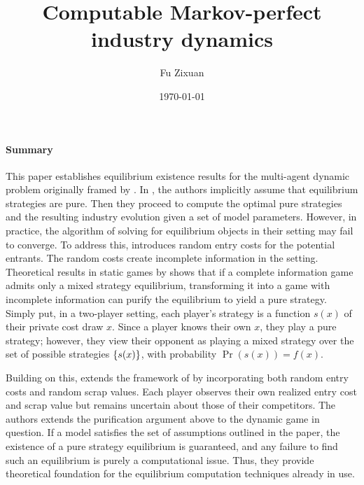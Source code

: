 \documentclass[12pt]{article}[margin=1in]
\title{\textbf{Computable Markov-perfect industry dynamics}}
\author{Fu Zixuan}
\date{\today}
\begin{document}
\maketitle






\paragraph{Summary} This paper \citep{doraszelski2010computable} establishes equilibrium existence results for the multi-agent dynamic problem originally framed by \citet{ericson1995markov}. In \citet{pakes1994computing}, the authors implicitly assume that equilibrium strategies are pure. Then they proceed to compute the optimal pure strategies and the resulting industry evolution given a set of model parameters. However, in practice, the algorithm of solving for equilibrium objects in their setting may fail to converge. To address this, \citet{pakes1994computing} introduces random entry costs for the potential entrants. The random costs create incomplete information in the setting.  Theoretical results in static games by \cite{harsanyi1973games} shows that if a complete information game admits only a mixed strategy equilibrium, transforming it into a game with incomplete information can purify the equilibrium to yield a pure strategy.  Simply put, in a two-player setting, each player's strategy is a function $s(x)$ of their private cost draw $x$. Since a player knows their own $x$, they play a pure strategy; however, they view their opponent as playing a mixed strategy over the set of possible strategies $\left\{s(x)\right\}$, with probability $\Pr(s(x))=f(x)$. 

Building on this, \citet{doraszelski2010computable} extends the framework of \citet{pakes1994computing} by incorporating both random entry costs and random scrap values. Each player observes their own realized entry cost and scrap value but remains uncertain about those of their competitors. The authors extends the purification argument above to the dynamic game in question. If a model satisfies the set of assumptions outlined in the paper, the existence of a pure strategy equilibrium is guaranteed, and any failure to find such an equilibrium is purely a computational issue. Thus, they provide theoretical foundation for the equilibrium computation techniques already in use.
\end{document}
